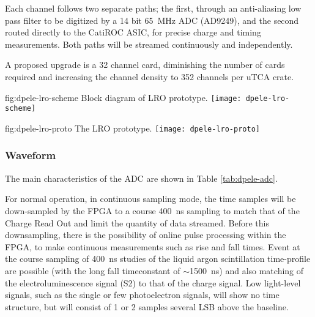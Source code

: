 Each channel follows two separate paths; the first, through an anti-aliasing low pass filter to be digitized by a \num{14} bit \SI{65}{\MHz} ADC (AD9249), and the second routed directly to the CatiROC ASIC, for precise charge and timing measurements. Both paths will be streamed continuously and independently.

A proposed upgrade is a \num{32} channel card, diminishing the number of cards required and increasing the channel density to 352 channels per uTCA crate.

\begin{dunefigure}{fig:dpele-lro-scheme}
{Block diagram of LRO prototype.}
\texttt{[image: dpele-lro-scheme]}
\end{dunefigure}

\begin{dunefigure}{fig:dpele-lro-proto}
{The LRO prototype.}
\texttt{[image: dpele-lro-proto]}
\end{dunefigure}

\subsubsection{Waveform} %
The main characteristics of the ADC are shown in Table \ref{tab:dpele-adc}.

For normal operation, in continuous sampling mode, the time samples will be down-sampled by the FPGA to a course \SI{400}{ns} sampling to match that of the Charge Read Out and limit the quantity of data streamed. Before this downsampling, there is the possibility of online pulse processing within the FPGA, to make continuous measurements such as rise and fall times. Event at the course sampling of \SI{400}{ns} studies of the liquid argon scintillation time-profile are possible (with the long fall timeconstant of $\sim$\SI{1500}{ns}) and also matching of the electroluminescence signal (S2) to that of the charge signal.  Low light-level signals, such as the single or few photoelectron signals, will show no time structure, but will consist of 1 or 2 samples several LSB above the baseline.


